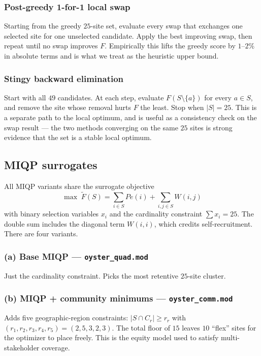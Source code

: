 \documentclass[11pt]{article}
\begin{document}
\subsubsection*{Post-greedy 1-for-1 local swap}
Starting from the greedy $25$-site set, evaluate every swap that exchanges one selected site for one unselected candidate. Apply the best improving swap, then repeat until no swap improves $F$. Empirically this lifts the greedy score by $1$--$2\%$ in absolute terms and is what we treat as the heuristic upper bound.

\subsubsection*{Stingy backward elimination}
Start with all $49$ candidates. At each step, evaluate $F(S \setminus \{a\})$ for every $a \in S$, and remove the site whose removal hurts $F$ the least. Stop when $|S|=25$. This is a separate path to the local optimum, and is useful as a consistency check on the swap result --- the two methods converging on the same $25$ sites is strong evidence that the set is a stable local optimum.

\subsection{MIQP surrogates}

All MIQP variants share the surrogate objective
\[
\max\;\tilde{F}(S) = \sum_{i \in S} Pe(i) + \sum_{i,j \in S} W(i, j)
\]
with binary selection variables $x_i$ and the cardinality constraint $\sum x_i = 25$. The double sum includes the diagonal term $W(i,i)$, which credits self-recruitment. There are four variants.

\subsubsection*{(a) Base MIQP --- \texttt{oyster\_quad.mod}}
Just the cardinality constraint. Picks the most retentive $25$-site cluster.

\subsubsection*{(b) MIQP + community minimums --- \texttt{oyster\_comm.mod}}
Adds five geographic-region constraints: $|S \cap C_r| \geq r_r$ with $(r_1, r_2, r_3, r_4, r_5) = (2, 5, 3, 2, 3)$. The total floor of $15$ leaves $10$ ``flex'' sites for the optimizer to place freely. This is the equity model used to satisfy multi-stakeholder coverage.
\end{document}
